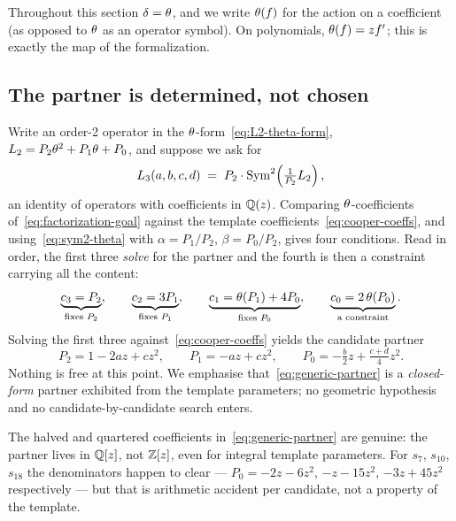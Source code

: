 Throughout this section $\delta = \theta$, and we write $\theta(f)$ for
the action on a coefficient (as opposed to $\theta$ as an operator symbol).
On polynomials, $\theta(f) = z f'$; this is exactly the map 
of the formalization.

\subsection{The partner is determined, not chosen}

Write an order-2 operator in the $\theta$-form~\eqref{eq:L2-theta-form},
$L_2 = P_2\theta^2 + P_1\theta + P_0$, and suppose we ask for
\begin{equation}\label{eq:factorization-goal}
  L_3(a,b,c,d) \;=\; P_2\cdot\operatorname{Sym}^2\!\left(\tfrac{1}{P_2}L_2\right),
\end{equation}
an identity of operators with coefficients in $\mathbb{Q}(z)$. Comparing
$\theta$-coefficients of~\eqref{eq:factorization-goal} against the template
coefficients~\eqref{eq:cooper-coeffs}, and using~\eqref{eq:sym2-theta} with
$\alpha = P_1/P_2$, $\beta = P_0/P_2$, gives four conditions. Read in order,
the first three \emph{solve} for the partner and the fourth is then a
constraint carrying all the content:
\begin{equation}\label{eq:four-conditions}
  \underbrace{c_3 = P_2}_{\text{fixes }P_2}, \qquad
  \underbrace{c_2 = 3P_1}_{\text{fixes }P_1}, \qquad
  \underbrace{c_1 = \theta(P_1) + 4P_0}_{\text{fixes }P_0}, \qquad
  \underbrace{c_0 = 2\,\theta(P_0)}_{\text{a constraint}}.
\end{equation}
Solving the first three against~\eqref{eq:cooper-coeffs} yields the candidate
partner
\begin{equation}\label{eq:generic-partner}
  P_2 = 1 - 2az + cz^2, \qquad
  P_1 = -az + cz^2, \qquad
  P_0 = -\tfrac{b}{2}z + \tfrac{c+d}{4}z^2 .
\end{equation}
Nothing is free at this point. We emphasise that~\eqref{eq:generic-partner} is
a \emph{closed-form} partner exhibited from the template parameters; no
geometric hypothesis and no candidate-by-candidate search enters.

\begin{remark}\label{rem:partner-not-integral}
The halved and quartered coefficients in~\eqref{eq:generic-partner} are
genuine: the partner lives in $\mathbb{Q}[z]$, not $\mathbb{Z}[z]$, even for integral
template parameters. For $s_7$, $s_{10}$, $s_{18}$ the denominators happen to
clear --- $P_0 = -2z-6z^2$, $-z-15z^2$, $-3z+45z^2$ respectively --- but that
is arithmetic accident per candidate, not a property of the template.
\end{remark}

